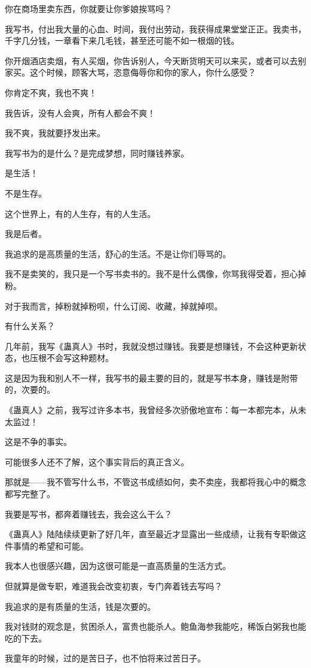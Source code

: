 \begin{this_body}
你在商场里卖东西，你就要让你爹娘挨骂吗？

我写书，付出我大量的心血、时间，我付出劳动，我获得成果堂堂正正。我卖书，千字几分钱，一章看下来几毛钱，甚至还可能不如一根烟的钱。

你开烟酒店卖烟，有人买烟，你告诉别人，今天断货明天可以来买，或者可以去别家买。这个时候，顾客大骂，恣意侮辱你和你的家人，你什么感受？

你肯定不爽，我也不爽！

我告诉，没有人会爽，所有人都会不爽！

我不爽，我就要抒发出来。

我写书为的是什么？是完成梦想，同时赚钱养家。

是生活！

不是生存。

这个世界上，有的人生存，有的人生活。

我是后者。

我追求的是高质量的生活，舒心的生活。不是让你们辱骂的。

我不是卖笑的，我只是一个写书卖书的。我不是什么偶像，你骂我得受着，担心掉粉。

对于我而言，掉粉就掉粉呗，什么订阅、收藏，掉就掉呗。

有什么关系？

几年前，我写《蛊真人》书时，我就没想过赚钱。我要是想赚钱，不会这种更新状态，也压根不会写这种题材。

这是因为我和别人不一样，我写书的最主要的目的，就是写书本身，赚钱是附带的，次要的。

《蛊真人》之前，我写过许多本书，我曾经多次骄傲地宣布：每一本都完本，从未太监过！

这是不争的事实。

可能很多人还不了解，这个事实背后的真正含义。

那就是——我不管写什么书，不管这书成绩如何，卖不卖座，我都将我心中的概念都写完整了。

我要是写书，都奔着赚钱去，我会这么干么？

《蛊真人》陆陆续续更新了好几年，直至最近才显露出一些成绩，让我有专职做这件事情的希望和可能。

我本人也很感兴趣，因为这很可能是一直高质量的生活方式。

但就算是做专职，难道我会改变初衷，专门奔着钱去写吗？

我追求的是有质量的生活，钱是次要的。

我对钱财的观念是，贫困杀人，富贵也能杀人。鲍鱼海参我能吃，稀饭白粥我也能吃的下去。

我童年的时候，过的是苦日子，也不怕将来过苦日子。


\end{this_body}
